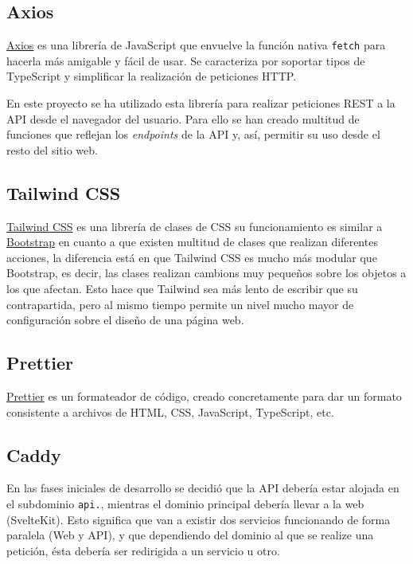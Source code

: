 \subsection{Axios}

\href{https://github.com/axios/axios}{Axios} es una librería de JavaScript que
envuelve la función nativa \texttt{fetch} para hacerla más amigable y fácil de
usar. Se caracteriza por soportar tipos de TypeScript y simplificar la
realización de peticiones HTTP.

En este proyecto se ha utilizado esta librería para realizar peticiones REST a
la API desde el navegador del usuario. Para ello se han creado multitud de
funciones que reflejan los \textit{endpoints} de la API y, así, permitir su uso
desde el resto del sitio web.

\subsection{Tailwind CSS}

\href{https://tailwindcss.com/}{Tailwind CSS} es una librería de clases de CSS
su funcionamiento es similar a \href{https://getbootstrap.com/}{Bootstrap} en
cuanto a que existen multitud de clases que realizan diferentes acciones, la
diferencia está en que Tailwind CSS es mucho más modular que Bootstrap, es
decir, las clases realizan cambions muy pequeños sobre los objetos a los que
afectan. Esto hace que Tailwind sea más lento de escribir que su contrapartida,
pero al mismo tiempo permite un nivel mucho mayor de configuración sobre el
diseño de una página web.

\subsection{Prettier}

\href{https://prettier.io/}{Prettier} es un formateador de código, creado
concretamente para dar un formato consistente a archivos de HTML, CSS,
JavaScript, TypeScript, etc.

\subsection{Caddy}

En las fases iniciales de desarrollo se decidió que la API debería estar alojada
en el subdominio \texttt{api.}, mientras el dominio principal debería llevar a
la web (SvelteKit). Esto significa que van a existir dos servicios funcionando
de forma paralela (Web y API), y que dependiendo del dominio al que se realize
una petición, ésta debería ser redirigida a un servicio u otro.

